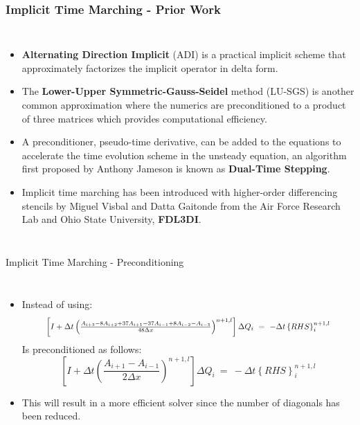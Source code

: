 \begin{frame}\frametitle{Implicit Time Marching - Prior Work}
  \begin{columns}
    \begin{itemize}
      \item \textbf{Alternating Direction Implicit} (ADI) is a practical implicit scheme that 
            approximately factorizes the implicit operator in delta form.
      \item The \textbf{Lower-Upper Symmetric-Gauss-Seidel} method (LU-SGS) is another common 
          approximation where the numerics are preconditioned to a product of three matrices which 
          provides computational efficiency.
      \item A preconditioner, pseudo-time derivative, can be added to the equations to accelerate
        the time evolution scheme in the unsteady equation, an algorithm first proposed by Anthony
        Jameson is known as \textbf{Dual-Time Stepping}.
      \item Implicit time marching has been introduced with higher-order differencing stencils
            by Miguel Visbal and Datta Gaitonde from the Air Force Research Lab and Ohio State 
            University, \textbf{FDL3DI}.
    \end{itemize}  
  \end{columns}
\end{frame}

\begin{frame}{Implicit Time Marching - Preconditioning}
  \begin{columns}
    \begin{itemize}
		  \item Instead of using:
      \begin{equation}
	      \label{eq:RDRP_NS}\resizebox{0.85\hsize}{!}{$%
  		  \left[I+\Delta{t}\left(\frac{A_{i+3}-8A_{i+2}+37A_{i+1}-37A_{i-1}+8A_{i-2}-A_{i-3}}
        {48\Delta{x}}\right)^{n+1,l}\right]\Delta{Q}_i~=~-\Delta{t}\left\{RHS\right\}_i^{n+1,l}$}
      \end{equation}
      Is preconditioned as follows:
      \begin{equation}
      	\label{eq:TriDi_NS}
        		\left[I+\Delta{t}\left(\frac{A_{i+1}-A_{i-1}}{2\Delta{x}}\right)^{n+1,l}\right]
            \Delta{Q}_i~=~-\Delta{t}\left\{RHS\right\}_i^{n+1, l}
      \end{equation}
		  \item This will result in a more efficient solver since the number of diagonals has been 
            reduced.
    \end{itemize}  
  \end{columns}
\end{frame}

